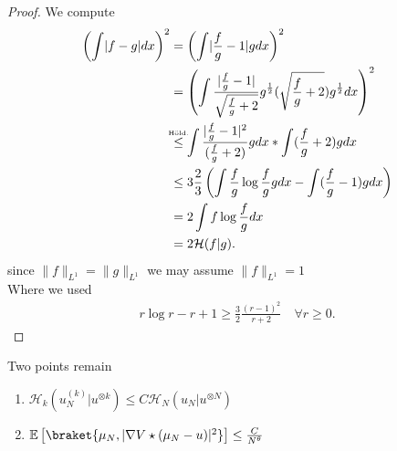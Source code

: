 \begin{proof}
 We compute 
 \begin{align*}
   \left( \int \abs{f-g} dx \right)^2 &=  \left( \int  \abs{\frac{f}{g} - 1} g  dx\right) ^2\\
                                      &= \left( \int  \frac{\abs{\frac{f}{g} - 1}}{\sqrt{\frac{f}{g} + 2}} g^{\frac{1}{2}}(\sqrt{\frac{f}{g}+2})g^{\frac{1}{2}} dx  \right) ^2\\
                                      &\myS{Höld.}{\le } \int \frac{\abs{\frac{f}{g}-1}^2}{(\frac{f}{g}+2)}g dx *\int (\frac{f}{g} + 2)g dx\\
                                      &\le  3 \frac{2}{3} \left( \int \frac{f}{g} \log \frac{f}{g} g dx - \int (\frac{f}{g} - 1) g dx \right) \\
                                      &= 2 \int f \log \frac{f}{g} dx\\
                                      &= 2 \mathcal{H}(f|g)
 .\end{align*}
 since $\|f\|_{L^{1} } = \|g\|_{L^{1} }$ we may assume $\|f\|_{L^1} = 1$ \\
 Where we used 
\begin{align*}
  r \log  r - r + 1 \ge  \frac{3}{2} \frac{(r-1)^2}{r+2} \quad \forall  r \ge 0
.\end{align*}
\end{proof}
\begin{note}
 Two points remain 
 \begin{enumerate}
   \item $\mathcal{H}_k(u_N^{(k)}|u^{\otimes k}  ) \le  C \mathcal{H}_N(u_N | u^{\otimes N} )$
   \item  $\E \left[ \braket{\mu_N,\abs{\nabla V \star (\mu_N - u)}^2} \right] \le  \frac{C}{N^{\theta } } $
 \end{enumerate}
\end{note}
